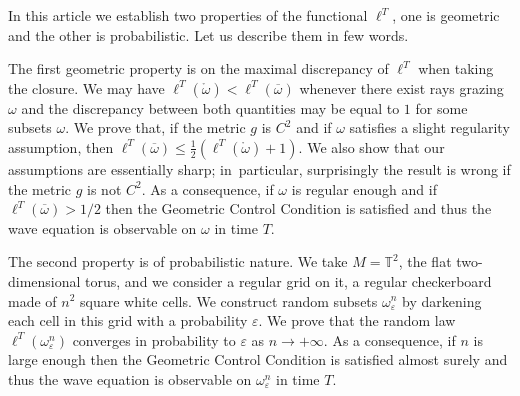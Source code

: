 \documentclass[10pt]{amsart}
\theoremstyle{definition}
\begin{document}
In this article we establish two properties of the functional $\ell^T$, one is geometric and the other is probabilistic. Let us describe them in few words.

The first geometric property is on the maximal discrepancy of $\ell^T$ when taking the closure. We may have $\ell^T(\mathring{\omega})<\ell^T(\overline\omega)$ whenever there exist rays grazing $\omega$ and the discrepancy between both quantities may be equal to $1$ for some subsets $\omega$. We prove that, if the metric $g$ is $C^2$ and if $\omega$ satisfies a slight regularity assumption, then $\ell^T(\overline\omega) \leq \frac{1}{2} \left( \ell^T(\mathring{\omega}) + 1 \right)$.
We also show that our assumptions are essentially sharp; in~particular, surprisingly the result is wrong if the metric $g$ is not $C^2$.
As a consequence, if $\omega$ is regular enough and if $\ell^T(\overline\omega)>1/2$ then the Geometric Control Condition is satisfied and thus the wave equation is observable on $\omega$ in time $T$.

The second property is of probabilistic nature. We take $M=\mathbb{T}^2$, the flat two-dimensional torus, and we consider a regular grid on it, a regular checkerboard made of $n^2$ square white cells. We construct random subsets $\omega_\varepsilon^n$ by darkening each cell in this grid with a probability $\varepsilon$. We prove that the random law $\ell^T(\omega_\varepsilon^n)$ converges in probability to $\varepsilon$ as $n\rightarrow+\infty$.
As a consequence, if $n$ is large enough then the Geometric Control Condition is satisfied almost surely and thus the wave equation is observable on $\omega_\varepsilon^n$ in time $T$.
\end{document}
